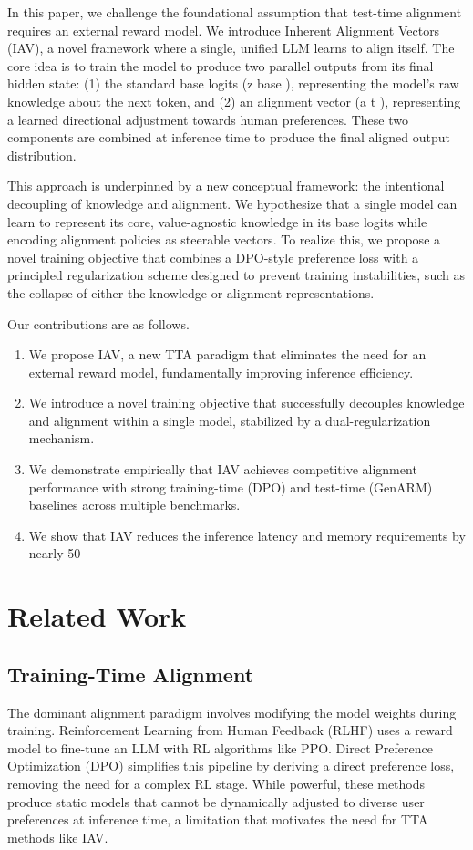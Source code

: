 \documentclass{article} %
\begin{document}
In this paper, we challenge the foundational assumption that test-time alignment requires an external reward model. We introduce Inherent Alignment Vectors (IAV), a novel framework where a single, unified LLM learns to align itself. The core idea is to train the model to produce two parallel outputs from its final hidden state: (1) the standard base logits (z 
base
 ), representing the model's raw knowledge about the next token, and (2) an alignment vector (a 
t
 ), representing a learned directional adjustment towards human preferences. These two components are combined at inference time to produce the final aligned output distribution.

This approach is underpinned by a new conceptual framework: the intentional decoupling of knowledge and alignment. We hypothesize that a single model can learn to represent its core, value-agnostic knowledge in its base logits while encoding alignment policies as steerable vectors. To realize this, we propose a novel training objective that combines a DPO-style preference loss with a principled regularization scheme designed to prevent training instabilities, such as the collapse of either the knowledge or alignment representations.

Our contributions are as follows.
\begin{enumerate}
\item We propose IAV, a new TTA paradigm that eliminates the need for an external reward model, fundamentally improving inference efficiency.
\item We introduce a novel training objective that successfully decouples knowledge and alignment within a single model, stabilized by a dual-regularization mechanism.
\item We demonstrate empirically that IAV achieves competitive alignment performance with strong training-time (DPO) and test-time (GenARM) baselines across multiple benchmarks.
\item We show that IAV reduces the inference latency and memory requirements by nearly 50%
\end{enumerate}

\section{Related Work}
\subsection{Training-Time Alignment}
The dominant alignment paradigm involves modifying the model weights during training. Reinforcement Learning from Human Feedback (RLHF) \citep{ouyang2022training} uses a reward model to fine-tune an LLM with RL algorithms like PPO. Direct Preference Optimization (DPO) \citep{rafailov2023direct} simplifies this pipeline by deriving a direct preference loss, removing the need for a complex RL stage. While powerful, these methods produce static models that cannot be dynamically adjusted to diverse user preferences at inference time, a limitation that motivates the need for TTA methods like IAV.
\end{document}
